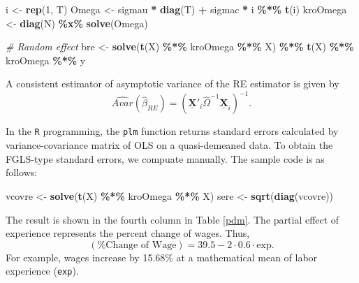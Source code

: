 \documentclass[
  12pt,
]{article}
\newenvironment{Shaded}{\begin{snugshade}}{\end{snugshade}}
\newcommand{\CommentTok}[1]{\textcolor[rgb]{0.56,0.35,0.01}{\textit{#1}}}
\newcommand{\DecValTok}[1]{\textcolor[rgb]{0.00,0.00,0.81}{#1}}
\newcommand{\KeywordTok}[1]{\textcolor[rgb]{0.13,0.29,0.53}{\textbf{#1}}}
\newcommand{\NormalTok}[1]{#1}
\newcommand{\OperatorTok}[1]{\textcolor[rgb]{0.81,0.36,0.00}{\textbf{#1}}}
\newcommand{\StringTok}[1]{\textcolor[rgb]{0.31,0.60,0.02}{#1}}
\begin{document}
\begin{Shaded}
\begin{Highlighting}[]
\NormalTok{i \textless{}{-}}\StringTok{ }\KeywordTok{rep}\NormalTok{(}\DecValTok{1}\NormalTok{, T)}
\NormalTok{Omega \textless{}{-}}\StringTok{ }\NormalTok{sigmau }\OperatorTok{*}\StringTok{ }\KeywordTok{diag}\NormalTok{(T) }\OperatorTok{+}\StringTok{ }\NormalTok{sigmac }\OperatorTok{*}\StringTok{ }\NormalTok{i }\OperatorTok{\%*\%}\StringTok{ }\KeywordTok{t}\NormalTok{(i)}
\NormalTok{kroOmega \textless{}{-}}\StringTok{ }\KeywordTok{diag}\NormalTok{(N) }\OperatorTok{\%x\%}\StringTok{ }\KeywordTok{solve}\NormalTok{(Omega)}

\CommentTok{\# Random effect}
\NormalTok{bre \textless{}{-}}\StringTok{ }\KeywordTok{solve}\NormalTok{(}\KeywordTok{t}\NormalTok{(X) }\OperatorTok{\%*\%}\StringTok{ }\NormalTok{kroOmega }\OperatorTok{\%*\%}\StringTok{ }\NormalTok{X) }\OperatorTok{\%*\%}\StringTok{ }\KeywordTok{t}\NormalTok{(X) }\OperatorTok{\%*\%}\StringTok{ }\NormalTok{kroOmega }\OperatorTok{\%*\%}\StringTok{ }\NormalTok{y}
\end{Highlighting}
\end{Shaded}

A consistent estimator of asymptotic variance of the RE estimator is
given by \[
  \hat{Avar}(\hat{\beta}_{RE}) = 
  \left( \underline{\mathbf{X}}'_i \hat{\Omega}^{-1} \underline{\mathbf{X}}_i \right)^{-1}.
\]

In the \texttt{R} programming, the \texttt{plm} function returns
standard errors calculated by variance-covariance matrix of OLS on a
quasi-demeaned data. To obtain the FGLS-type standard errors, we
compuate manually. The sample code is as follows:

\begin{Shaded}
\begin{Highlighting}[]
\NormalTok{vcovre \textless{}{-}}\StringTok{ }\KeywordTok{solve}\NormalTok{(}\KeywordTok{t}\NormalTok{(X) }\OperatorTok{\%*\%}\StringTok{ }\NormalTok{kroOmega }\OperatorTok{\%*\%}\StringTok{ }\NormalTok{X)}
\NormalTok{sere \textless{}{-}}\StringTok{ }\KeywordTok{sqrt}\NormalTok{(}\KeywordTok{diag}\NormalTok{(vcovre))}
\end{Highlighting}
\end{Shaded}

The result is shown in the fourth column in Table \ref{pdm}. The partial
effect of experience represents the percent change of wages. Thus, \[
  (\text{\% Change of Wage}) = 39.5 - 2 \cdot 0.6 \cdot \text{exp}.
\] For example, wages increase by 15.68\% at a mathematical mean of
labor experience (\texttt{exp}).
\end{document}
